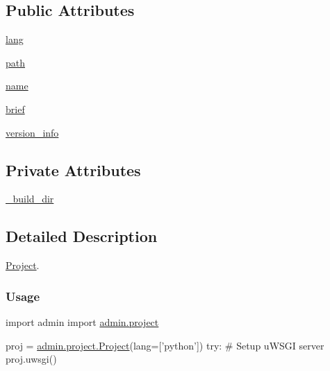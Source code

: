 \subsection*{Public Attributes}
\begin{DoxyCompactItemize}
\item 
\hyperlink{classadmin_1_1project_1_1Project_add0eb047a815df47b9b888aa8a028b77}{lang}
\item 
\hyperlink{classadmin_1_1project_1_1Project_a4a925408cb4575a4f8e880918decdf7d}{path}
\item 
\hyperlink{classadmin_1_1project_1_1Project_a9b8c34b91f1ecdbbdcfea42e771dd6d6}{name}
\item 
\hyperlink{classadmin_1_1project_1_1Project_ac3e2b73e80631fe2171b8d4b236f2e53}{brief}
\item 
\hyperlink{classadmin_1_1project_1_1Project_aead4e47be18c6ddbfd19d3b5aab88bda}{version\-\_\-info}
\end{DoxyCompactItemize}
\subsection*{Private Attributes}
\begin{DoxyCompactItemize}
\item 
\hyperlink{classadmin_1_1project_1_1Project_a9357a34aaccfd3fc391b4081f6794ee8}{\-\_\-build\-\_\-dir}
\end{DoxyCompactItemize}


\subsection{Detailed Description}
\hyperlink{classadmin_1_1project_1_1Project}{Project}. 

\subsubsection*{Usage}


\begin{DoxyPre}{\ttfamily 
      import admin
      import \hyperlink{namespaceadmin_1_1project}{admin.project}}\end{DoxyPre}



\begin{DoxyPre}{\ttfamily       proj = \hyperlink{classadmin_1_1project_1_1Project}{admin.project.Project}(lang=['python'])
      try:
          \# Setup uWSGI server
          proj.uwsgi()}\end{DoxyPre}



